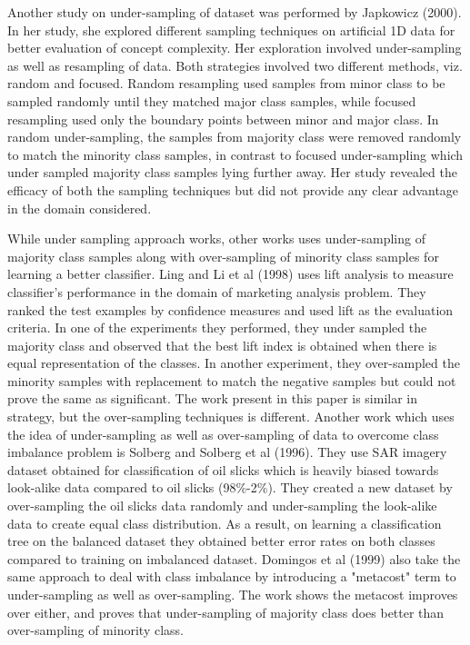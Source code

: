 \documentclass[10pt,journal,compsoc]{IEEEtran}
\begin{document}
Another study on under-sampling of dataset was performed by Japkowicz (2000). 
In her study, she explored different sampling techniques on artificial 1D data for better evaluation of concept complexity.
Her exploration involved under-sampling as well as resampling of data.
Both strategies involved two different methods, viz. random and focused. 
Random resampling used samples from minor class to be sampled randomly until they matched major class samples, while focused resampling used only the boundary points between minor and major class.
In random under-sampling, the samples from majority class were removed randomly to match the minority class samples, in contrast to focused under-sampling which under sampled majority class samples lying further away.
Her study revealed the efficacy of both the sampling techniques but did not provide any clear advantage in the domain considered.

While under sampling approach works, other works uses under-sampling of majority class samples along with over-sampling of minority class samples for learning a better classifier.
Ling and Li et al (1998) uses lift analysis to measure classifier's performance in the domain of marketing analysis problem.
They ranked the test examples by confidence measures and used lift as the evaluation criteria.
In one of the experiments they performed, they under sampled the majority class and observed that the best lift index is obtained when there is equal representation of the classes.
In another experiment, they over-sampled the minority samples with replacement to match the negative samples but could not prove the same as significant. 
The work present in this paper is similar in strategy, but the over-sampling techniques is different.
Another work which uses the idea of under-sampling as well as over-sampling of data to overcome class imbalance problem is Solberg and Solberg et al (1996).
They use SAR imagery dataset obtained for classification of oil slicks which is heavily biased towards look-alike data compared to oil slicks (98\%-2\%). 
They created a new dataset by over-sampling the oil slicks data randomly and under-sampling the look-alike data to create equal class distribution.
As a result, on learning a classification tree on the balanced dataset they obtained better error rates on both classes compared to training on imbalanced dataset.
Domingos et al (1999) also take the same approach to deal with class imbalance by introducing a "metacost" term to under-sampling as well as over-sampling.
The work shows the metacost improves over either, and proves that under-sampling of majority class does better than over-sampling of minority class.
\end{document}
